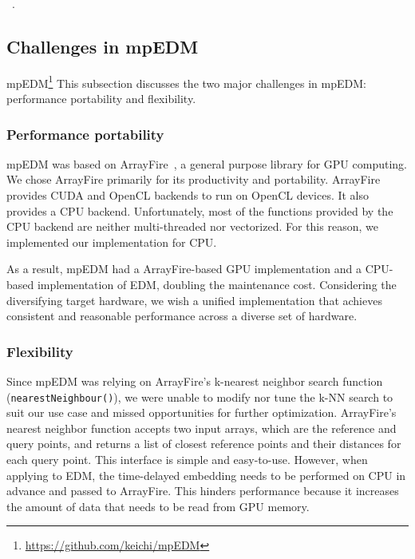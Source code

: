 \documentclass[conference]{IEEEtran}
\begin{document}
~\cite{Pu2019,Ma2017}.

\subsection{Challenges in mpEDM}\label{sec:challenges}

mpEDM\footnote{\url{https://github.com/keichi/mpEDM}}
This subsection discusses the two major challenges in mpEDM: performance
portability and flexibility.

\subsubsection{Performance portability}

mpEDM was based on ArrayFire~\cite{Malcolm2012}, a general purpose library for
GPU computing. We chose ArrayFire primarily for its productivity and
portability. ArrayFire provides CUDA and OpenCL backends to run on OpenCL
devices. It also provides a CPU backend. Unfortunately, most of the functions
provided by the CPU backend are neither multi-threaded nor vectorized. For this
reason, we implemented our implementation for CPU\@.

As a result, mpEDM had a ArrayFire-based GPU implementation and a CPU-based
implementation of EDM, doubling the maintenance cost. Considering the
diversifying target hardware, we wish a unified implementation that achieves
consistent and reasonable performance across a diverse set of hardware.

\subsubsection{Flexibility}

Since mpEDM was relying on ArrayFire's k-nearest neighbor search function
(\texttt{nearestNeighbour()}), we were unable to modify nor tune the k-NN
search to suit our use case and missed opportunities for further optimization.
ArrayFire's nearest neighbor function accepts two input arrays, which are the
reference and query points, and returns a list of closest reference points and
their distances for each query point. This interface is simple and
easy-to-use. However, when applying to EDM, the time-delayed embedding needs
to be performed on CPU in advance and passed to ArrayFire. This hinders
performance because it increases the amount of data that needs to be read from
GPU memory.
\end{document}
